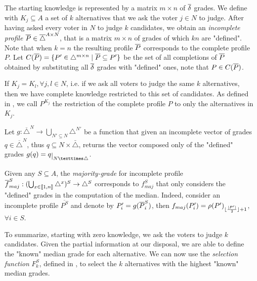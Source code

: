 \documentclass[version=3.21, pagesize, twoside=off, bibliography=totoc, DIV=calc, fontsize=12pt, a4paper]{scrartcl}
\begin{document}
The starting knowledge is represented by a matrix $m\times n$ of $\overline{\delta}$ grades. We define with $K_j \subseteq A$ a set of $k$ alternatives that we ask the voter $j\in N$ to judge. 
After having asked every voter in $N$ to judge $k$ candidates, we obtain an \emph{incomplete profile} $\overline{P}\in \overline{\triangle}^{A \times N}$, that is a matrix $m \times n$ of grades of which $kn$ are "defined".
Note that when $k=n$ the resulting profile $\overline{P}$ corresponds to the complete profile $P$. Let $C(\Pbar) = \{P' \in \triangle^{m \times n} \suchthat \Pbar \subseteq P'\}$ be the set of all completions of $\overline{P}$ obtained by substituting all $\overline{\delta}$ grades with "defined" ones, note that $P \in C(\overline{P})$.
 
If $K_j=K_l, \forall j,l\in N$, i.e. if we ask all voters to judge the same $k$ alternatives, then we have complete knowledge restricted to this set of candidates. As defined in , we call $P^{K_j}$ the restriction of the complete profile $P$ to only the alternatives in $K_j$.

Let $g:\overline{\triangle}^N\rightarrow \bigcup_{N' \subseteq N}\triangle^{N'}$ be a function that given an incomplete vector of grades $q \in \overline{\triangle}^N$, thus $q \subseteq N × \bar{\triangle}$, returns the vector composed only of the "defined" grades $g(q) = \restr{q}{N × \triangle}$.


Given any $S \subseteq A$, the \emph{majority-grade} for incomplete profile $\overline{f}^S_{maj}: (\bigcup_{x \in \llbracket1,n\rrbracket}\triangle^{x})^S \rightarrow \triangle^S$ corresponds to $f^S_{maj}$ that only considers the "defined" grades in the computation of the median. Indeed, consider an incomplete profile $\overline{P^S}$ and denote by $P'_i=g(\overline{P}^S_i)$, then ${f}_{maj}(P'_i) = \rho(P')_{\lfloor\frac{\lvert P'\rvert}{2}\rfloor + 1}$, $\forall i \in S$.

To summarize, starting with zero knowledge, we ask the voters to judge $k$ candidates. Given the partial information at our disposal, we are able to define the "known" median grade for each alternative. We can now use the \emph{selection function} $F^S_k$, defined in , to select the $k$ alternatives with the highest "known" median grades.
\end{document}
